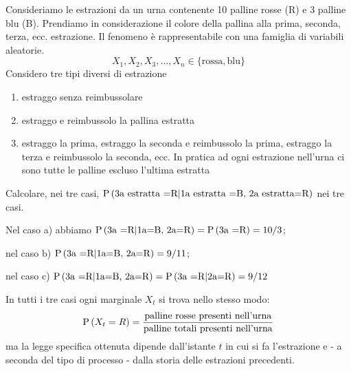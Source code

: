 \begin{exmp}\label{ex-fond}
Consideriamo le estrazioni da un urna contenente 10 palline rosse (R) e 3 palline blu (B). Prendiamo in considerazione il colore della pallina alla prima, seconda, terza, ecc. estrazione. Il fenomeno \`e  rappresentabile con una famiglia di variabili aleatorie.
	\begin{equation*}
	X_1, X_2, X_3, \hdots, X_n \in \{\text{rossa}, \text{blu}\}
	\end{equation*}
Considero tre tipi diversi di estrazione
\begin{enumerate}
\item estraggo senza reimbussolare
\item estraggo e reimbussolo la pallina estratta
\item estraggo la prima, estraggo la seconda e reimbussolo la prima, estraggo la terza e reimbussolo la
seconda, ecc. In pratica ad ogni estrazione nell'urna ci sono tutte le palline escluso l'ultima estratta
\end{enumerate}
Calcolare, nei tre casi, $\text{P}\left(\text{3a estratta =R} | \text{1a estratta =B, 2a estratta=R} \right)$ nei tre casi.

Nel caso a) abbiamo  $\text{P}\left(\text{3a =R} | \text{1a=B, 2a=R} \right)=\text{P}\left(\text{3a =R}\right)=10/3$;

nel caso b)
 $\text{P}\left(\text{3a =R} | \text{1a=B, 2a=R} \right)=9/11$;

 nel caso c)
 $\text{P}\left(\text{3a =R} | \text{1a=B, 2a=R} \right)=\text{P}\left(\text{3a =R} | \text{2a=R} \right)= 9/12 $
\end{exmp}

In tutti i tre casi ogni marginale $X_t$ si trova nello stesso modo:
 $$\text{P}\left(X_t=R\right)=\frac{\text{palline rosse presenti nell'urna}}{\text{palline totali presenti nell'urna}}$$  ma la legge specifica ottenuta dipende dall'istante $t$ in cui si fa l'estrazione e - a seconda del tipo di processo - dalla storia delle estrazioni precedenti.

